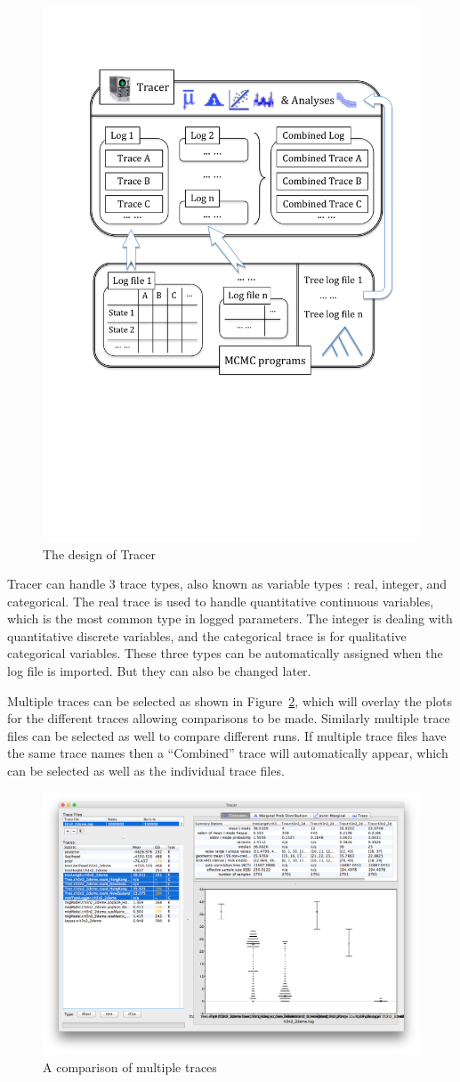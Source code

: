 \documentclass{bioinfo}
\begin{document}
\begin{figure}[ht]
\includegraphics[width=.38\textwidth]{./figures/tracer.pdf}  
\caption{The design of Tracer}
\label{fig:tracer}
\end{figure}

Tracer can handle 3 trace types, also known as variable types \citep{mendenhall2012introduction}: real, integer, and categorical.
The real trace is used to handle quantitative continuous variables, which is the most common type in logged parameters.
The integer is dealing with quantitative discrete variables, and the categorical trace is for qualitative categorical variables. 
These three types can be automatically assigned when the log file is imported. But they can also be changed later. 

Multiple traces can be selected as shown in Figure~\ref{fig:multitrace}, which will overlay the plots for the different traces allowing comparisons to be made. Similarly multiple trace files can be selected as well to compare different runs. If multiple trace files have the same trace names then a ``Combined'' trace will automatically appear, which can be selected as well as the individual trace files.

\begin{figure}[ht]
\includegraphics[width=.5\textwidth]{./figures/multitrace.png}  
\caption{A comparison of multiple traces}
\label{fig:multitrace}
\end{figure}
\end{document}
